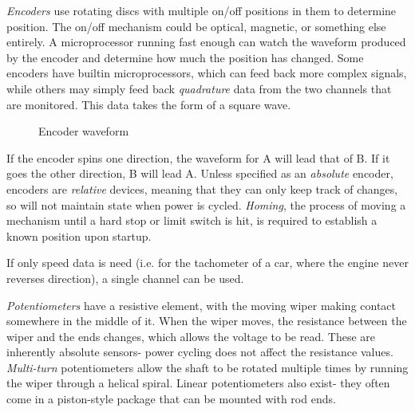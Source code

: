 \begin{asparaenum}[a)]
\item \textit{Encoders} use rotating discs with multiple on/off positions in them to determine position. The on/off mechanism could be optical, magnetic, or something else entirely. A microprocessor running fast enough can watch the waveform produced by the encoder and determine how much the position has changed. Some encoders have builtin microprocessors, which can feed back more complex signals, while others may simply feed back \textit{quadrature} data from the two channels that are monitored. This data takes the form of a square wave.

\begin{figure}[H]
\caption{Encoder waveform}
\end{figure}

If the encoder spins one direction, the waveform for A will lead that of B. If it goes the other direction, B will lead A. Unless specified as an \textit{absolute} encoder, encoders are \textit{relative} devices, meaning that they can only keep track of changes, so will not maintain state when power is cycled. \textit{Homing}, the process of moving a mechanism until a hard stop or limit switch is hit, is required to establish a known position upon startup.

If only speed data is need (i.e. for the tachometer of a car, where the engine never reverses direction), a single channel can be used.

\item \textit{Potentiometers} have a resistive element, with the moving wiper making contact somewhere in the middle of it. When the wiper moves, the resistance between the wiper and the ends changes, which allows the voltage to be read. These are inherently absolute sensors- power cycling does not affect the resistance values. \textit{Multi-turn} potentiometers allow the shaft to be rotated multiple times by running the wiper through a helical spiral. Linear potentiometers also exist- they often come in a piston-style package that can be mounted with rod ends.
\end{asparaenum}

